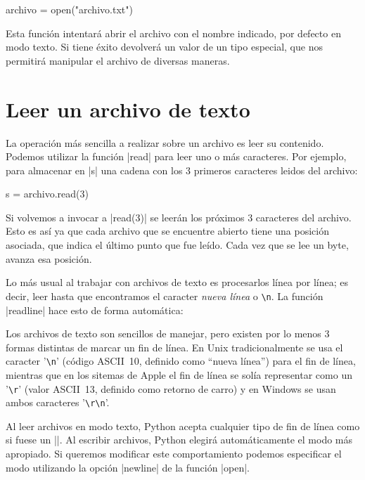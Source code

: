 \begin{codigo-python-sn}
archivo = open("archivo.txt")
\end{codigo-python-sn}

Esta función intentará abrir el archivo con el nombre indicado, por defecto en
modo texto. Si tiene éxito devolverá un valor de un tipo especial, que nos
permitirá manipular el archivo de diversas maneras.

\section{Leer un archivo de texto}

La operación más sencilla a realizar sobre un archivo es leer su contenido.
Podemos utilizar la función |read| para leer uno o más caracteres. Por ejemplo,
para almacenar en |s| una cadena con los 3 primeros caracteres leidos del archivo:

\begin{codigo-python-sn}
s = archivo.read(3)
\end{codigo-python-sn}

Si volvemos a invocar a |read(3)| se leerán los próximos 3 caracteres del archivo.
Esto es así ya que cada archivo que se encuentre abierto tiene una
posición asociada, que indica el último punto que fue leído.  Cada vez que
se lee un byte, avanza esa posición.

Lo más usual al trabajar con archivos de texto es procesarlos línea por línea;
es decir, leer hasta que encontramos el caracter \emph{nueva línea} o \verb!\n!. La
función |readline| hace esto de forma automática:

\begin{sabias_que}
Los archivos de texto son sencillos de manejar, pero existen por lo menos 3
formas distintas de marcar un fin de línea. En Unix tradicionalmente se usa
el caracter '\verb!\n!' (código ASCII~10, definido como ``nueva línea'') para
el fin de línea, mientras que en los sitemas de Apple el fin de línea se solía
representar como un '\verb!\r!' (valor ASCII~13, definido como retorno de
carro) y en Windows se usan ambos caracteres '\verb!\r\n!'.

Al leer archivos en modo texto, Python acepta cualquier tipo de fin
de línea como si fuese un |\n|. Al escribir archivos, Python elegirá
automáticamente el modo más apropiado. Si queremos modificar este
comportamiento podemos especificar el modo utilizando la opción |newline| de la
función |open|.
\end{sabias_que}

